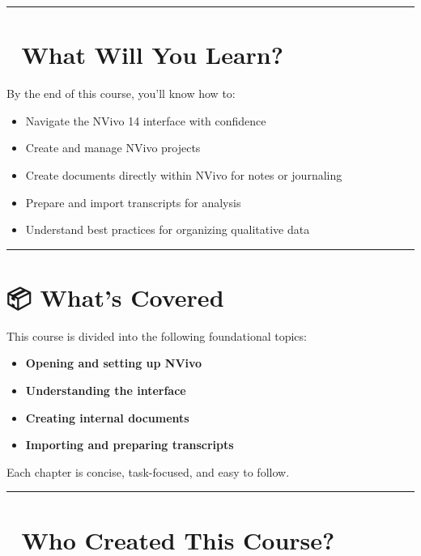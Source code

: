 \documentclass[
  letterpaper,
  DIV=11,
  numbers=noendperiod]{scrreprt}
\providecommand{\tightlist}{%
  \setlength{\itemsep}{0pt}\setlength{\parskip}{0pt}}\usepackage{longtable,booktabs,array}
\begin{document}
\begin{center}\rule{0.5\linewidth}{0.5pt}\end{center}

\section{🎯 What Will You Learn?}\label{what-will-you-learn}

By the end of this course, you'll know how to:

\begin{itemize}
\tightlist
\item
  Navigate the NVivo 14 interface with confidence
\item
  Create and manage NVivo projects
\item
  Create documents directly within NVivo for notes or journaling
\item
  Prepare and import transcripts for analysis
\item
  Understand best practices for organizing qualitative data
\end{itemize}

\begin{center}\rule{0.5\linewidth}{0.5pt}\end{center}

\section{📦 What's Covered}\label{whats-covered}

This course is divided into the following foundational topics:

\begin{itemize}
\tightlist
\item
  \textbf{Opening and setting up NVivo}
\item
  \textbf{Understanding the interface}
\item
  \textbf{Creating internal documents}
\item
  \textbf{Importing and preparing transcripts}
\end{itemize}

Each chapter is concise, task-focused, and easy to follow.

\begin{center}\rule{0.5\linewidth}{0.5pt}\end{center}

\section{🧠 Who Created This Course?}\label{who-created-this-course}
\end{document}
